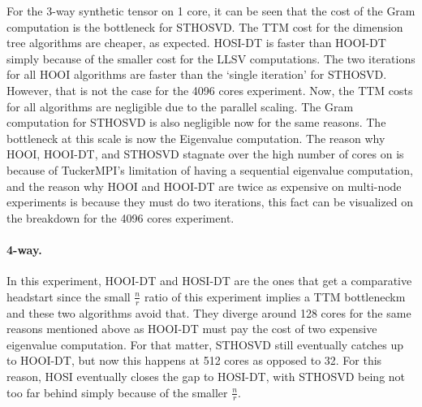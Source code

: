     For the 3-way synthetic tensor on 1 core, it can be seen
    that the cost of the Gram computation is the bottleneck for STHOSVD. The
    TTM cost for the dimension tree algorithms are cheaper, as expected. HOSI-DT
    is faster than HOOI-DT simply because of the smaller cost for the LLSV
    computations. The two iterations for all HOOI algorithms are faster than the
    `single iteration' for STHOSVD. However, that is not the case for the 4096
    cores experiment. Now, the TTM costs for all algorithms are negligible due
    to the parallel scaling. The Gram computation for STHOSVD is also
    negligible now for the same reasons. The bottleneck at this scale is now the
    Eigenvalue computation. The reason why HOOI, HOOI-DT, and STHOSVD stagnate
    over the high number of cores on  is because of
    TuckerMPI's limitation of having a sequential eigenvalue computation, and
    the reason why HOOI and HOOI-DT are twice as expensive on multi-node
    experiments is because they must do two iterations, this fact can be
    visualized on the breakdown for the 4096 cores experiment.

    \paragraph{4-way.} In this experiment, HOOI-DT and HOSI-DT are the ones that
    get a comparative headstart since the small $\frac{n}{r}$ ratio of this
    experiment implies a TTM bottleneckm and these two algorithms avoid that.
    They diverge around 128 cores for the same reasons mentioned above as
    HOOI-DT must pay the cost of two expensive eigenvalue computation. For that
    matter, STHOSVD still eventually catches up to HOOI-DT, but now this
    happens at 512 cores as opposed to 32. For this reason, HOSI eventually
    closes the gap to HOSI-DT, with STHOSVD being not too far behind simply
    because of the smaller $\frac{n}{r}$.

